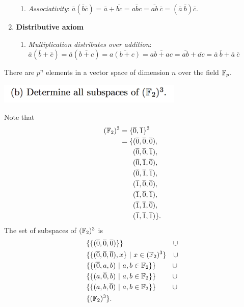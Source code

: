 \documentclass[12pt]{article}
\begin{document}
\begin{mdframed}
\begin{enumerate}
\begin{enumerate}
    \item \textit{Associativity}:
      $\bar a (\bar b \bar c) = \bar a + \bar {bc} = \bar{abc} =
      \bar{ab}~\bar{c} = (\bar a ~ \bar b) \bar{c}$.
    \end{enumerate}
  \item \textbf{Distributive axiom}
    \begin{enumerate}
    \item \textit{Multiplication distributes over addition}: $\bar a (\bar b + \bar c) = \bar a (\bar{b + c}) = \bar{a(b+c)} = \bar{ab +
      ac} = \bar{ab} + \bar{ac} = \bar{a}~\bar{b} + \bar{a}~\bar{c}$
    \end{enumerate}
  \end{enumerate}

There are $p^n$ elements in a vector space of dimension $n$ over the field $\mathbb{F}_p$.
\end{mdframed}
\includegraphics[width=250pt]{img/linear-algebra-a0-1-1-b.png}
\begin{mdframed}
  Note that
  \begin{align*}
    (\mathbb{F}_2)^3 = \{&\overline 0, \overline 1\}^3\\
             = \{&(\overline 0, \overline 0, \overline 0),\\
                 &(\overline 0, \overline 0, \overline 1),\\
                 &(\overline 0, \overline 1, \overline 0),\\
                 &(\overline 0, \overline 1, \overline 1),\\
                 &(\overline 1, \overline 0, \overline 0),\\
                 &(\overline 1, \overline 0, \overline 1),\\
                 &(\overline 1, \overline 1, \overline 0),\\
                 &(\overline 1, \overline 1, \overline 1)\}.
  \end{align*}
  The set of subspaces of $(\mathbb{F}_2)^3$ is
  \begin{align*}
    &\{\{(\overline 0, \overline 0, \overline 0)\}\} ~~~~~~~~~~~~~~~~~~~~~ \cup\\
    &\{\{(\overline 0, \overline 0, \overline 0), x\} ~|~ x \in (\mathbb{F}_2)^3\} ~~~ \cup\\
    &\{\{(\overline 0, a, b) ~|~ a, b \in \mathbb{F}_2\}\}  ~~~~~~~ \cup\\
    &\{\{(a, \overline 0, b) ~|~ a, b \in \mathbb{F}_2\}\}  ~~~~~~~ \cup\\
    &\{\{(a, b, \overline 0) ~|~ a, b \in \mathbb{F}_2\}\}  ~~~~~~~ \cup\\
    &\{(\mathbb{F}_2)^3\}.
  \end{align*}
\end{mdframed}
\end{document}
